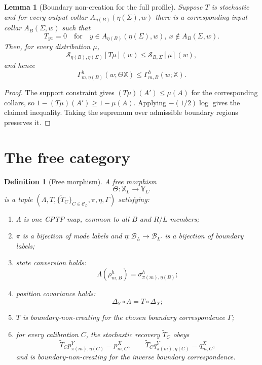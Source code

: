 \documentclass[11pt]{article}
\newtheorem{definition}{Definition}
\newtheorem{lemma}{Lemma}
\newcommand{\calB}{\mathcal B}
\newcommand{\calC}{\mathcal C}
\begin{document}
\begin{lemma}[Boundary non-creation for the full profile]
Suppose $T$ is stochastic and for every output collar
$A_{\eta(B)}(\eta(\Sigma),w)$ there is a corresponding input collar
$A_B(\Sigma,w)$ such that
\[
T_{yx}=0
\quad\text{for}\quad
 y\in A_{\eta(B)}(\eta(\Sigma),w),\ x\notin A_B(\Sigma,w).
\]
Then, for every distribution $\mu$,
\[
\mathcal S_{\eta(B),\eta(\Sigma)}[T\mu](w)
\le
\mathcal S_{B,\Sigma}[\mu](w),
\]
and hence
\[
\Gamma_{m,\eta(B)}^{h}(w;\Theta\mathbb X)
\le
\Gamma_{m,B}^{h}(w;\mathbb X).
\]
\end{lemma}

\begin{proof}
The support constraint gives $(T\mu)(A')\le\mu(A)$ for the corresponding collars,
so $1-(T\mu)(A')\ge1-\mu(A)$. Applying $-(1/2)\log$ gives the claimed inequality.
Taking the supremum over admissible boundary regions preserves it.
\end{proof}

\section{The free category}
\label{sec:free}

\begin{definition}[Free morphism]
A free morphism
\[
\Theta:\mathbb X_L\longrightarrow\mathbb Y_{L'}
\]
is a tuple $(\Lambda,T,\{\widetilde T_C\}_{C\in\calC_L},\pi,\eta,\Gamma)$ satisfying:
\begin{enumerate}[leftmargin=1.8em]
\item $\Lambda$ is one CPTP map, common to all $B$ and $R/L$ members;
\item $\pi$ is a bijection of mode labels and $\eta:\calB_L\to\calB_{L'}$ is a bijection of boundary labels;
\item state conversion holds:
\[
\Lambda(\rho_{m,B}^{h})
=\sigma_{\pi(m),\eta(B)}^{h};
\]
\item position covariance holds:
\[
\Delta_Y\circ\Lambda=T\circ\Delta_X;
\]
\item $T$ is boundary-non-creating for the chosen boundary correspondence $\Gamma$;
\item for every calibration $C$, the stochastic recovery $\widetilde T_C$ obeys
\[
\widetilde T_C p_{\pi(m),\eta(C)}^{Y}=p_{m,C}^{X},
\qquad
\widetilde T_C q_{\pi(m),\eta(C)}^{Y}=q_{m,C}^{X},
\]
and is boundary-non-creating for the inverse boundary correspondence.
\end{enumerate}
\end{definition}
\end{document}
